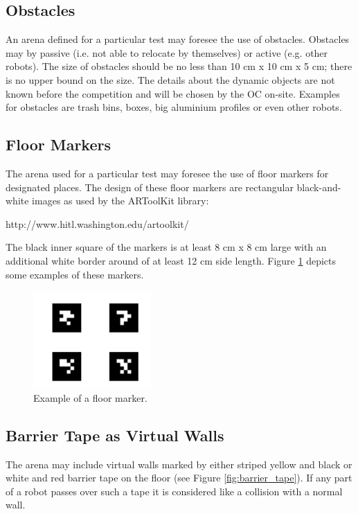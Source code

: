 \subsection{Obstacles}
An arena defined for a particular test may foresee the use of obstacles. Obstacles may by passive (i.e. not able to relocate by themselves) or active (e.g. other robots). The size of obstacles should be no less than 10 cm x 10 cm x 5 cm; there is no upper bound on the size. The details about the dynamic objects are not known before the competition and will be chosen by the OC on-site. Examples for obstacles are trash bins, boxes, big aluminium profiles or even other robots.

\subsection{Floor Markers}
The arena used for a particular test may foresee the use of floor markers for designated places. The design of these floor markers are rectangular black-and-white images as used by the ARToolKit library:

http://www.hitl.washington.edu/artoolkit/

The black inner square of the markers is at least 8 cm x 8 cm large with an additional white border around of at least 12 cm side length. Figure \ref{fig:floor_marker} depicts some examples of these markers.

\begin{figure}
\centering
\includegraphics[width= 0.4\textwidth ]{../images/example_floor_marker.png}
\caption{Example of a floor marker.}
\label{fig:floor_marker}
\end{figure}


\subsection{Barrier Tape as Virtual Walls}
The arena may include virtual walls marked by either striped yellow and black or white and red barrier tape on the floor (see Figure \ref{fig:barrier_tape}). If any part of a robot passes over such a tape it is considered like a collision with a normal wall.

